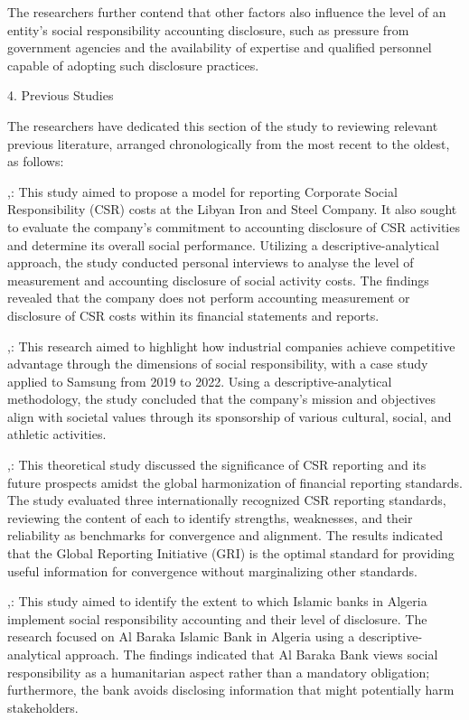 \documentclass{default}
\begin{document}
The researchers further contend that other factors also influence the level of an entity's social responsibility accounting disclosure, such as pressure from government agencies and the availability of expertise and qualified personnel capable of adopting such disclosure practices.

4. Previous Studies

The researchers have dedicated this section of the study to reviewing relevant previous literature, arranged chronologically from the most recent to the oldest, as follows:

\cite{ref29},: This study aimed to propose a model for reporting Corporate Social Responsibility (CSR) costs at the Libyan Iron and Steel Company. It also sought to evaluate the company's commitment to accounting disclosure of CSR activities and determine its overall social performance. Utilizing a descriptive-analytical approach, the study conducted personal interviews to analyse the level of measurement and accounting disclosure of social activity costs. The findings revealed that the company does not perform accounting measurement or disclosure of CSR costs within its financial statements and reports.

\cite{ref31},: This research aimed to highlight how industrial companies achieve competitive advantage through the dimensions of social responsibility, with a case study applied to Samsung from 2019 to 2022. Using a descriptive-analytical methodology, the study concluded that the company's mission and objectives align with societal values through its sponsorship of various cultural, social, and athletic activities.

\cite{ref28},: This theoretical study discussed the significance of CSR reporting and its future prospects amidst the global harmonization of financial reporting standards. The study evaluated three internationally recognized CSR reporting standards, reviewing the content of each to identify strengths, weaknesses, and their reliability as benchmarks for convergence and alignment. The results indicated that the Global Reporting Initiative (GRI) is the optimal standard for providing useful information for convergence without marginalizing other standards.

\cite{ref21},: This study aimed to identify the extent to which Islamic banks in Algeria implement social responsibility accounting and their level of disclosure. The research focused on Al Baraka Islamic Bank in Algeria using a descriptive-analytical approach. The findings indicated that Al Baraka Bank views social responsibility as a humanitarian aspect rather than a mandatory obligation; furthermore, the bank avoids disclosing information that might potentially harm stakeholders.
\end{document}
